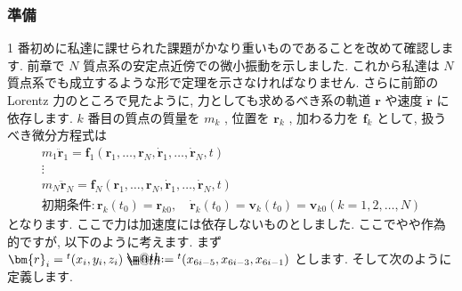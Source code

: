 \documentclass[openany, a4paper, oneside]{jsbook}
\makeatletter
\newcommand*{\defeq}{\mathrel{\rlap{%
\raisebox{0.3ex}{$\m@th\cdot$}}%
\raisebox{-0.3ex}{$\m@th\cdot$}}%
=}
\theoremstyle{break}
\theoremstyle{breakdefn}
\makeatother
\begin{document}
\subsubsection{準備}


1 番初めに私達に課せられた課題がかなり重いものであることを改めて確認します.
前章で $N$ 質点系の安定点近傍での微小振動を示しました.
これから私達は $N$ 質点系でも成立するような形で定理を示さなければなりません.
さらに前節の Lorentz 力のところで見たように,
力としても求めるべき系の軌道 $\bm{r}$ や速度 $\dot{ \bm{r} }$ に依存します.
$k$ 番目の質点の質量を $m_k$ , 位置を $\bm{r}_k$ , 加わる力を $\bm{f}_k$ として, 扱うべき微分方程式は
\begin{gather}
m_1 \ddot{ \bm{r} }_1 = \bm{f}_1 ( \bm{r}_1, \dots , \bm{r}_N , \dot{ \bm{r} }_1 , \dots , \dot{ \bm{r} }_N , t)\\
\vdots \\
m_N \ddot{ \bm{r} }_N = \bm{f}_N ( \bm{r}_1, \dots , \bm{r}_N , \dot{ \bm{r} }_1 , \dots , \dot{ \bm{r} }_N , t )\\
\text{初期条件}:
\bm{r}_k (t_0) = \bm{r}_{k0}
, \quad
\dot{ \bm{r} }_k (t_0) = \bm{v}_k ( t_0 ) = \bm{v}_{k0}
( k = 1 , 2 , \dots , N )
\end{gather}
となります.
ここで力は加速度には依存しないものとしました.
ここでやや作為的ですが, 以下のように考えます.
まず $\bm{r}_i = {^t}( x_i , y_i , z_i ) \defeq {^t} ( x_{6i-5} , x_{6i-3} , x_{6i-1} )$ とします.
そして次のように定義します.
\end{document}
